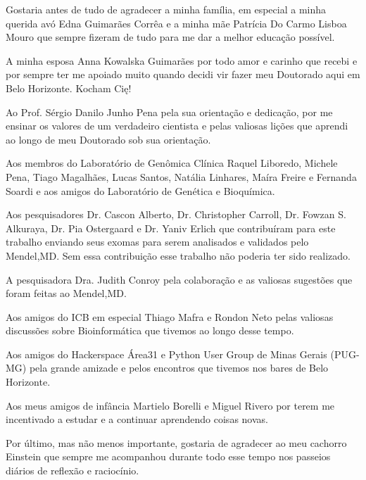 \documentclass[
	12pt,				%
	openany,			%
	oneside,			%
	a4paper,			%
	english,			%
	brazil,				%
	]{abntex2}
\begin{document}
\begin{agradecimentos}

Gostaria antes de tudo de agradecer a minha família, em especial a minha querida avó Edna Guimarães Corrêa e a minha mãe Patrícia Do Carmo Lisboa Mouro que sempre fizeram de tudo para me dar a melhor educação possível.

A minha esposa Anna Kowalska Guimarães por todo amor e carinho que recebi e por sempre ter me apoiado muito quando decidi vir fazer meu Doutorado aqui em Belo Horizonte. Kocham Cię!

Ao Prof. Sérgio Danilo Junho Pena pela sua orientação e dedicação, por me ensinar os valores de um verdadeiro cientista e pelas valiosas lições que aprendi ao longo de meu Doutorado sob sua orientação.

Aos membros do Laboratório de Genômica Clínica Raquel Liboredo, Michele Pena, Tiago Magalhães, Lucas Santos, Natália Linhares, Maíra Freire e Fernanda Soardi e aos amigos do Laboratório de Genética e Bioquímica.

Aos pesquisadores Dr. Cascon Alberto, Dr. Christopher Carroll, Dr. Fowzan S. Alkuraya, Dr. Pia Ostergaard e Dr. Yaniv Erlich que contribuíram para este trabalho enviando seus exomas para serem analisados e validados pelo Mendel,MD. Sem essa contribuição esse trabalho não poderia ter sido realizado.

A pesquisadora Dra. Judith Conroy pela colaboração e as valiosas sugestões que foram feitas ao Mendel,MD.

Aos amigos do ICB em especial Thiago Mafra e Rondon Neto pelas valiosas discussões sobre Bioinformática que tivemos ao longo desse tempo.

Aos amigos do Hackerspace Área31 e Python User Group de Minas Gerais (PUG-MG) pela grande amizade e pelos encontros que tivemos nos bares de Belo Horizonte.

Aos meus amigos de infância Martielo Borelli e Miguel Rivero por terem me incentivado a estudar e a continuar aprendendo coisas novas.

Por último, mas não menos importante, gostaria de agradecer ao meu cachorro Einstein que sempre me acompanhou durante todo esse tempo nos passeios diários de reflexão e raciocínio.

\end{agradecimentos}
% 
\end{document}
